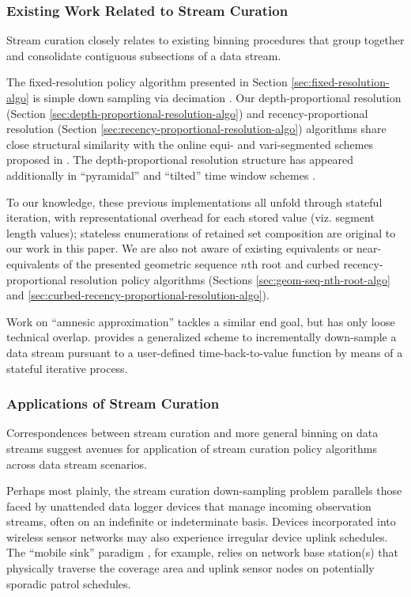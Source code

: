 \subsubsection{Existing Work Related to Stream Curation}

Stream curation closely relates to existing binning procedures that group together and consolidate contiguous subsections of a data stream.

The fixed-resolution policy algorithm presented in Section \ref{sec:fixed-resolution-algo} is simple down sampling via decimation \citep[p. 31]{crochiere1983multirate}.
Our depth-proportional resolution (Section \ref{sec:depth-proportional-resolution-algo}) and recency-proportional resolution (Section \ref{sec:recency-proportional-resolution-algo}) algorithms share close structural similarity with the online equi- and vari-segmented schemes proposed in
\citep{zhao2005generalized}.
The depth-proportional resolution structure has appeared additionally in ``pyramidal'' and ``tilted'' time window schemes \citep{aggarwal2003framework,han2005stream}.

To our knowledge, these previous implementations all unfold through stateful iteration, with representational overhead for each stored value (viz. segment length values); stateless enumerations of retained set composition are original to our work in this paper.
We are also not aware of existing equivalents or near-equivalents of the presented geometric sequence $n$th root and curbed recency-proportional resolution policy algorithms (Sections \ref{sec:geom-seq-nth-root-algo} and \ref{sec:curbed-recency-proportional-resolution-algo}).

Work on ``amnesic approximation'' tackles a similar end goal, but has only loose technical overlap.
\cite{palpanas2004online} provides a generalized scheme to incrementally down-sample a data stream pursuant to a user-defined time-back-to-value function by means of a stateful iterative process.

\subsubsection{Applications of Stream Curation}

Correspondences between stream curation and more general binning on data streams suggest avenues for application of stream curation policy algorithms across data stream scenarios.

Perhaps most plainly, the stream curation down-sampling problem parallels those faced by unattended data logger devices that manage incoming observation streams, often on an indefinite or indeterminate basis.
Devices incorporated into wireless sensor networks may also experience irregular device uplink schedules.
The ``mobile sink'' paradigm \citep{jain2022survey}, for example, relies on network base station(s) that physically traverse the coverage area and uplink sensor nodes on potentially sporadic patrol schedules.

